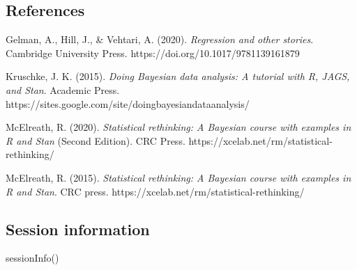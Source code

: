 \documentclass[
  letterpaper,
  DIV=11,
  numbers=noendperiod]{scrartcl}
\newenvironment{Shaded}{\begin{snugshade}}{\end{snugshade}}
\newcommand{\FunctionTok}[1]{\textcolor[rgb]{0.28,0.35,0.67}{#1}}
\newcommand{\NormalTok}[1]{\textcolor[rgb]{0.00,0.23,0.31}{#1}}
\begin{document}
\subsection{References}\label{references}

Gelman, A., Hill, J., \& Vehtari, A. (2020). \emph{Regression and other
stories}. Cambridge University Press.
https://doi.org/10.1017/9781139161879

Kruschke, J. K. (2015). \emph{Doing Bayesian data analysis: A tutorial
with R, JAGS, and Stan}. Academic Press.
https://sites.google.com/site/doingbayesiandataanalysis/

McElreath, R. (2020). \emph{Statistical rethinking: A Bayesian course
with examples in R and Stan} (Second Edition). CRC Press.
https://xcelab.net/rm/statistical-rethinking/

McElreath, R. (2015). \emph{Statistical rethinking: A Bayesian course
with examples in R and Stan}. CRC press.
https://xcelab.net/rm/statistical-rethinking/

\subsection{Session information}\label{session-information}

\begin{Shaded}
\begin{Highlighting}[]
\FunctionTok{sessionInfo}\NormalTok{()}
\end{Highlighting}
\end{Shaded}
\end{document}
